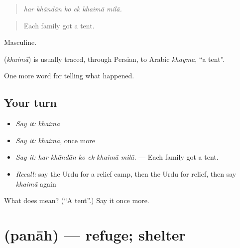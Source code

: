 \begin{quote}
     
\end{quote}

\begin{quote}
\emph{har khāndān ko ek khaimā milā.}
\end{quote}

\begin{quote}
Each family got a tent.
\end{quote}

Masculine.

\begin{cousinweb}
\textbf{} (\emph{khaimā}) is usually traced, through Persian, to Arabic \emph{khayma}, \textquotedblleft{}a tent\textquotedblright{}.
\end{cousinweb}

\begin{grammarlens}[title={What you've built}]
One more word for telling what happened.
\end{grammarlens}

\subsection*{Your turn}
\begin{itemize}
\raggedright
  \item \emph{Say it:} \emph{khaimā}
  \item \emph{Say it:} \emph{khaimā}, once more
  \item \emph{Say it:} \emph{har khāndān ko ek khaimā milā.} — Each family got a tent.
  \item \emph{Recall:} say the Urdu for a relief camp, then the Urdu for relief, then say \emph{khaimā} again
\end{itemize}

\begin{tcolorbox}[breakable,colback=teal!4,colframe=teal!35!black,title={Before you move on}]
What does  mean? (\textquotedblleft{}A tent\textquotedblright{}.) Say it once more.
\end{tcolorbox}
\section[\texorpdfstring{\ur{پناہ} (panāh)}{پناہ (panāh)}]{ (panāh) — refuge; shelter}

\label{lesson:UR-C297-panah}



